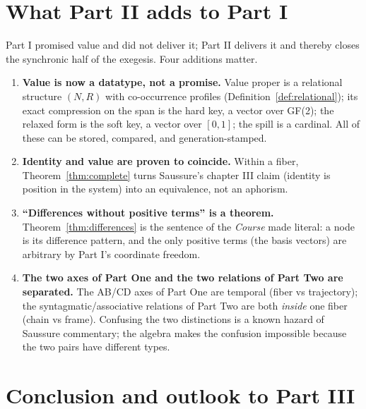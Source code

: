\documentclass[11pt,a4paper]{article}
\theoremstyle{remark}
\begin{document}
\FloatBarrier
\section{What Part II adds to Part I}
\label{sec:adds}

Part I promised value and did not deliver it; Part II delivers it and thereby
closes the synchronic half of the exegesis. Four additions matter.

\begin{enumerate}[leftmargin=*,nosep]
  \item \textbf{Value is now a datatype, not a promise.} Value proper is a
    relational structure $(N,R)$ with co-occurrence profiles
    (Definition~\ref{def:relational}); its exact compression on the span is
    the hard key, a vector over GF(2); the relaxed form is the soft key, a
    vector over $[0,1]$; the spill is a cardinal. All of these can be stored,
    compared, and generation-stamped.
  \item \textbf{Identity and value are proven to coincide.} Within a fiber,
    Theorem~\ref{thm:complete} turns Saussure's chapter III claim (identity is
    position in the system) into an equivalence, not an aphorism.
  \item \textbf{``Differences without positive terms'' is a theorem.}
    Theorem~\ref{thm:differences} is the sentence of the \textit{Course} made
    literal: a node is its difference pattern, and the only positive terms
    (the basis vectors) are arbitrary by Part I's coordinate freedom.
  \item \textbf{The two axes of Part One and the two relations of Part Two
    are separated.} The AB/CD axes of Part One are temporal (fiber vs
    trajectory); the syntagmatic/associative relations of Part Two are both
    \emph{inside} one fiber (chain vs frame). Confusing the two distinctions
    is a known hazard of Saussure commentary; the algebra makes the confusion
    impossible because the two pairs have different types.
\end{enumerate}

\section{Conclusion and outlook to Part III}
\label{sec:conclusion}
\end{document}
